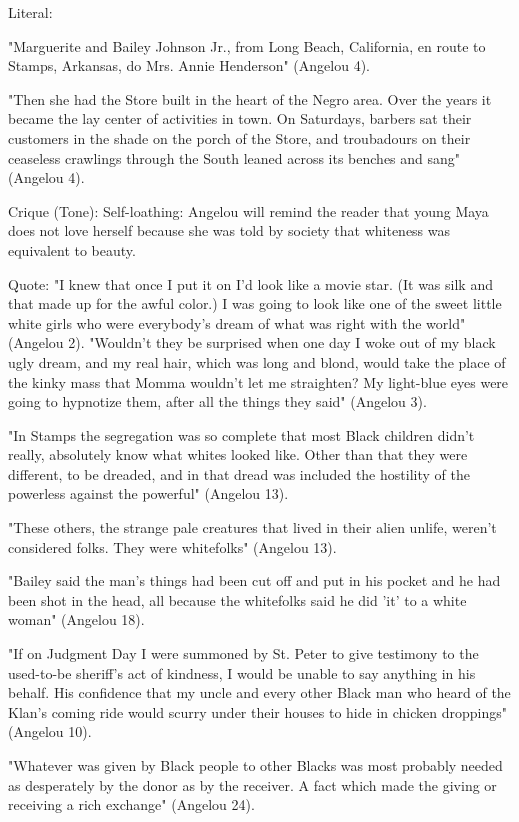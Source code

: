 
Literal:

"Marguerite and Bailey Johnson Jr., from Long Beach, California, en route to Stamps, Arkansas, do Mrs. Annie Henderson" (Angelou 4).

"Then she had the Store built in the heart of the Negro area. Over the years it became the lay center of activities in town. On Saturdays, barbers sat their customers in the shade on the porch of the Store, and troubadours on their ceaseless crawlings through the South leaned across its benches and sang" (Angelou 4).

Crique (Tone): 
Self-loathing: Angelou will remind the reader that young Maya does not love herself because she was told by society that whiteness was equivalent to beauty.

Quote:
"I knew that once I put it on I'd look like a movie star. (It was silk and that made up for the awful color.) I was going to look like one of the sweet little white girls who were everybody's dream of what was right with the world" (Angelou 2).
"Wouldn't they be surprised when one day I woke out of my black ugly dream, and my real hair, which was long and blond, would take the place of the kinky mass that Momma wouldn't let me straighten? My light-blue eyes were going to hypnotize them, after all the things they said" (Angelou 3).



"In Stamps the segregation was so complete that most Black children didn't really, absolutely know what whites looked like. Other than that they were different, to be dreaded, and in that dread was included the hostility of the powerless against the powerful" (Angelou 13).

"These others, the strange pale creatures that lived in their alien unlife, weren't considered folks. They were whitefolks" (Angelou 13).


"Bailey said the man's things had been cut off and put in his pocket and he had been shot in the head, all because the whitefolks said he did 'it' to a white woman" (Angelou 18).


"If on Judgment Day I were summoned by St. Peter to give testimony to the used-to-be sheriff's act of kindness, I would be unable to say anything in his behalf. His confidence that my uncle and every other Black man who heard of the Klan's coming ride would scurry under their houses to hide in chicken droppings" (Angelou 10).

"Whatever was given by Black people to other Blacks was most probably needed as desperately by the donor as by the receiver. A fact which made the giving or receiving a rich exchange" (Angelou 24).
